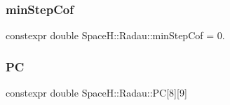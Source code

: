 \subsubsection{\texorpdfstring{min\+Step\+Cof}{minStepCof}}
{\footnotesize\ttfamily constexpr double Space\+H\+::\+Radau\+::min\+Step\+Cof = 0.}

\mbox{\label{namespace_space_h_1_1_radau_a24cc5eaca3250fc45186dd96873afe73}} 
\subsubsection{\texorpdfstring{PC}{PC}}
{\footnotesize\ttfamily constexpr double Space\+H\+::\+Radau\+::\+PC\mbox{[}8\mbox{]}\mbox{[}9\mbox{]}}


